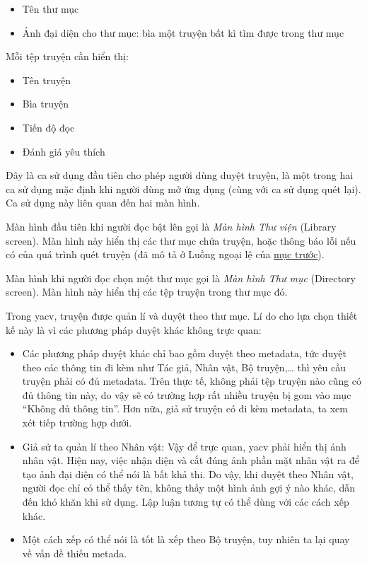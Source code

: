 \documentclass[
]{article}
\begin{document}
\begin{itemize}
  \begin{itemize}
    \item
    Tên thư mục
  \item
    Ảnh đại diện cho thư mục: bìa một truyện bất kì tìm được trong thư
    mục
  \end{itemize}

  Mỗi tệp truyện cần hiển thị:

  \begin{itemize}
    \item
    Tên truyện
  \item
    Bìa truyện
  \item
    Tiến độ đọc
  \item
    Đánh giá yêu thích
  \end{itemize}
\end{itemize}

Đây là ca sử dụng đầu tiên cho phép người dùng duyệt truyện, là một
trong hai ca sử dụng mặc định khi người dùng mở ứng dụng (cùng với ca sử
dụng quét lại). Ca sử dụng này liên quan đến hai màn hình.

Màn hình đầu tiên khi người đọc bật lên gọi là \emph{Màn hình Thư viện}
(Library screen). Màn hình này hiển thị các thư mục chứa truyện, hoặc
thông báo lỗi nếu có của quá trình quét truyện (đã mô tả ở Luồng ngoại
lệ của \protect\hyperlink{P3.3.1-scan}{mục trước}).

Màn hình khi người đọc chọn một thư mục gọi là \emph{Màn hình Thư mục}
(Directory screen). Màn hình này hiển thị các tệp truyện trong thư mục
đó.

Trong yacv, truyện được quản lí và duyệt theo thư mục. Lí do cho lựa
chọn thiết kế này là vì các phương pháp duyệt khác không trực quan:

\begin{itemize}
\item
  Các phương pháp duyệt khác chỉ bao gồm duyệt theo metadata, tức duyệt
  theo các thông tin đi kèm như Tác giả, Nhân vật, Bộ truyện,\ldots{}
  thì yêu cầu truyện phải có đủ metadata. Trên thực tế, không phải tệp
  truyện nào cũng có đủ thông tin này, do vậy sẽ có trường hợp rất nhiều
  truyện bị gom vào mục ``Không đủ thông tin''. Hơn nữa, giả sử truyện
  có đi kèm metadata, ta xem xét tiếp trường hợp dưới.
\item
  Giả sử ta quản lí theo Nhân vật: Vậy để trực quan, yacv phải hiển thị
  ảnh nhân vật. Hiện nay, việc nhận diện và cắt đúng ảnh phần mặt nhân
  vật ra để tạo ảnh đại diện có thể nói là bất khả thi. Do vậy, khi
  duyệt theo Nhân vật, người đọc chỉ có thể thấy tên, không thấy một
  hình ảnh gợi ý nào khác, dẫn đến khó khăn khi sử dụng. Lập luận tương
  tự có thể dùng với các cách xếp khác.
\item
  Một cách xếp có thể nói là tốt là xếp theo Bộ truyện, tuy nhiên ta lại
  quay về vấn đề thiếu metada.
\end{itemize}
\end{document}

